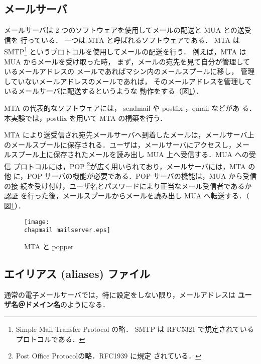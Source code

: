 \subsection*{メールサーバ}
メールサーバは 2 つのソフトウェアを使用してメールの配送と MUA との送受信を
行っている．
一つは MTA と呼ばれるソフトウェアである．
MTA は SMTP\footnote{Simple Mail Transfer Protocol の略．
SMTP は RFC5321 で規定されているプロトコルである．}
というプロトコルを使用してメールの配送を行う．
例えば，MTA は MUA からメールを受け取った時，
まず，メールの宛先を見て自分が管理しているメールアドレスの
メールであればマシン内のメールスプールに移し，
管理していないメールアドレスのメールであれば，
そのメールアドレスを管理しているメールサーバに配送するというような
動作をする（図\ref{fig:07:mailserver.eps}）．


MTA の代表的なソフトウェアには， sendmail や postfix ，qmail などがあ
る．本実験では，postfix を用いて MTA の構築を行う．


MTA により送受信され宛先メールサーバへ到着したメールは，メールサーバ上
のメールスプールに保存される．ユーザは，メールサーバにアクセスし，メー
ルスプール上に保存されたメールを読み出し MUA 上へ受信する．MUA への受信
プロトコルには，POP \footnote{Post Office Protocolの略．RFC1939 に規定
  されている．}が広く用いられており，メールサーバには，MTA の他
に，POP サーバの機能が必要である．POP サーバの機能は，MUA から受信の接
続を受け付け，ユーザ名とパスワードにより正当なメール受信者であるか認証
を行った後，メールスプールからメールを読み出し MUA へ転送する．（
図\ref{fig:07:mailserver.eps}）．
% 
 \begin{figure}[hbt]
  \begin{center}
   \texttt{[image: \\chapmail mailserver.eps]}   
   \caption{MTA と popper}
   \label{fig:07:mailserver.eps}
  \end{center}
 \end{figure}


\subsection*{エイリアス (aliases) ファイル}
通常の電子メールサーバでは，特に設定をしない限り，メールアドレスは
{\bf ユーザ名＠ドメイン名}のようになる．

